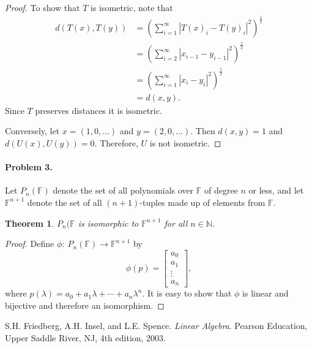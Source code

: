 \documentclass{article}
\newtheorem{theorem}{Theorem}
\begin{document}
\begin{proof}
To show that $T$ is isometric, note that
\begin{align*}
d(T(x),T(y))&=\left(\sum_{i=1}^{\infty}|T(x)_{i}-T(y)_{i}|^{2}\right)^{\frac{1}{2}} \\
&=\left(\sum_{i=2}^{\infty}|x_{i-1}-y_{i-1}|^{2}\right)^{\frac{1}{2}} \\
&=\left(\sum_{i=1}^{\infty}|x_{i}-y_{i}|^{2}\right)^{\frac{1}{2}} \\
&=d(x,y).
\end{align*}
Since $T$ preserves distances it is isometric. 

Conversely, let $x=(1,0,\ldots)$ and $y=(2,0,\ldots)$. Then $d(x,y)=1$ and $d(U(x),U(y))=0$. Therefore, $U$ is not isometric. 
\end{proof}

\paragraph*{Problem 3.} Let $P_{n}(\mathbb{F})$ denote the set of all polynomials over $\mathbb{F}$ of degree $n$ or less, and let $\mathbb{F}^{n+1}$ denote the set of all $(n+1)$-tuples made up of elements from $\mathbb{F}$. 
\begin{theorem}
$P_{n}(\mathbb{F}$ is isomorphic to $\mathbb{F}^{n+1}$ for all $n\in\mathbb{N}$.
\end{theorem}
\begin{proof}
Define $\phi\colon~P_{n}(\mathbb{F})\rightarrow\mathbb{F}^{n+1}$ by
\[
\phi(p)=\begin{bmatrix}a_{0}\\a_{1}\\\vdots\\a_{n}\end{bmatrix},
\]
where $p(\lambda)=a_{0}+a_{1}\lambda+\cdots+a_{n}\lambda^{n}$. It is easy to show that $\phi$ is linear and bijective and therefore an isomorphism. 
\end{proof}
\begin{thebibliography}{9}
S.H. Friedberg, A.H. Insel, and L.E. Spence.
\textit{Linear Algebra}.
Pearson Education, Upper Saddle River, NJ, 4th edition, 2003.
\end{thebibliography}
\end{document}
